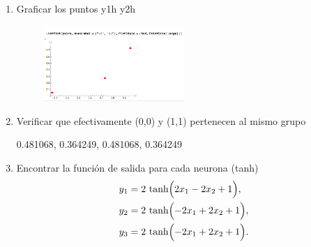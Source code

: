 \documentclass{article}
\begin{document}
\begin{flushleft}
\begin{enumerate}
  \item Graficar los puntos y1h y2h
  \begin{figure}[H]
    \centering
    \includegraphics[width=0.5\textwidth]{4_h.PNG}  %
  \end{figure}

  \item Verificar que efectivamente (0,0) y (1,1) pertenecen al mismo grupo
  
  0.481068, 0.364249, 0.481068, 0.364249

  \item Encontrar la función de salida para cada neurona (tanh)
\[
\begin{aligned}
  y_1 &= 2\,\tanh\Bigl(2x_1 - 2x_2 + 1\Bigr), \\
  y_2 &= 2\,\tanh\Bigl(-2x_1 + 2x_2 + 1\Bigr), \\
  y_3 &= 2\,\tanh\Bigl(-2x_1 + 2x_2 + 1\Bigr).
\end{aligned}
\]


\end{enumerate}
\end{flushleft}
\end{document}
